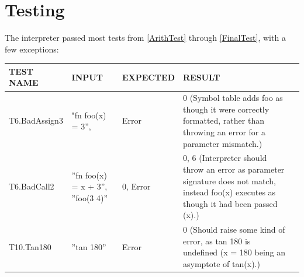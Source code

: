 \documentclass[a4paper, oneside, 11pt]{report}
\begin{document}





    \clearpage
    \section{Testing}
    The interpreter passed most tests from \ref{ArithTest} through \ref{FinalTest}, with a few exceptions:
    \begin{center}
        \begin{tabular}{|p{1.5in}|p{1.5in}|p{1in}|p{1.6in}|p{2.4in}|}
            \hline
            TEST NAME & INPUT & EXPECTED & RESULT \\
            \hline
            T6.BadAssign3 & "fn foo(x) = 3”, & Error & 0 (Symbol table adds foo as though it were correctly formatted, rather than throwing an error for a parameter mismatch.) \\
            \hline
            T6.BadCall2 & ”fn foo(x) = x + 3”, ”foo(3 4)” & 0, Error & 0, 6 (Interpreter should throw an error as parameter signature does not match, instead foo(x) executes as though it had been passed (x).) \\
            \hline
            T10.Tan180 & ”tan 180” & Error & 0 (Should raise some kind of error, as tan 180 is undefined (x = 180 being an asymptote of tan(x).) \\
            \hline
        \end{tabular}
    \end{center}
\end{document}
